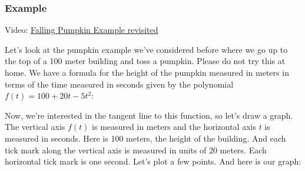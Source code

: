 \documentclass[pdftex, brazil, 12pt, twoside]{article}
\begin{document}
\subsubsection{Example}
\label{u1-geometric-example}

Video: \href{https://www.youtube.com/watch?v=hOVozgeyCD0}{Falling Pumpkin Example revisited}

Let's look at the pumpkin example
we've considered before where we go up to the top of a 100 meter
building and toss a pumpkin.
Please do not try this at home.
We have a formula for the height of the pumpkin measured
in meters in terms of the time measured in seconds given
by the polynomial $f(t) = 100 + 20t - 5t^2$:

\begin{figure}[H]
  \begin{center}
  \end{center}
\end{figure}

Now, we're interested in the tangent line to this function,
so let's draw a graph.
The vertical axis $f(t)$ is measured
in meters and the horizontal axis $t$ is measured in seconds.
Here is 100 meters, the height of the building.
And each tick mark along the vertical axis
is measured in units of 20 meters.
Each horizontal tick mark is one second.
Let's plot a few points.
And here is our graph:

\begin{figure}[H]
  \begin{center}
  \end{center}
\end{figure}
\end{document}
